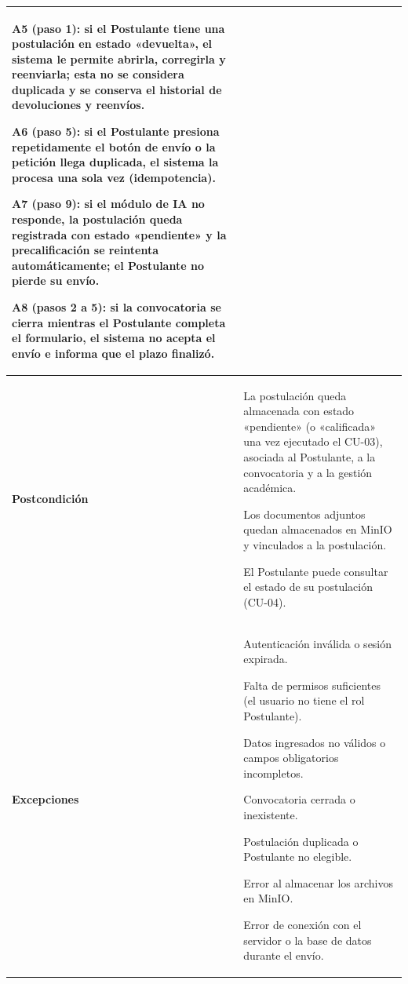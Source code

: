 \begin{longtable}{>{\raggedright\arraybackslash}p{2.9cm} >{\raggedright\arraybackslash}p{12.6cm}}
\begin{cuvin}
    \item A5 (paso 1): si el Postulante tiene una postulación en estado «devuelta», el sistema le permite abrirla, corregirla y reenviarla; esta no se considera duplicada y se conserva el historial de devoluciones y reenvíos.
    \item A6 (paso 5): si el Postulante presiona repetidamente el botón de envío o la petición llega duplicada, el sistema la procesa una sola vez (idempotencia).
    \item A7 (paso 9): si el módulo de IA no responde, la postulación queda registrada con estado «pendiente» y la precalificación se reintenta automáticamente; el Postulante no pierde su envío.
    \item A8 (pasos 2 a 5): si la convocatoria se cierra mientras el Postulante completa el formulario, el sistema no acepta el envío e informa que el plazo finalizó.
\end{cuvin} \\
\midrule
\textbf{Postcondición} & \vspace{-\baselineskip}\begin{cuvin}
    \item La postulación queda almacenada con estado «pendiente» (o «calificada» una vez ejecutado el CU-03), asociada al Postulante, a la convocatoria y a la gestión académica.
    \item Los documentos adjuntos quedan almacenados en MinIO y vinculados a la postulación.
    \item El Postulante puede consultar el estado de su postulación (CU-04).
\end{cuvin} \\
\midrule
\textbf{Excepciones} & \vspace{-\baselineskip}\begin{cuvin}
    \item Autenticación inválida o sesión expirada.
    \item Falta de permisos suficientes (el usuario no tiene el rol Postulante).
    \item Datos ingresados no válidos o campos obligatorios incompletos.
    \item Convocatoria cerrada o inexistente.
    \item Postulación duplicada o Postulante no elegible.
    \item Error al almacenar los archivos en MinIO.
    \item Error de conexión con el servidor o la base de datos durante el envío.
\end{cuvin} \\
\end{longtable}
\endgroup
\addtocounter{table}{-1}

